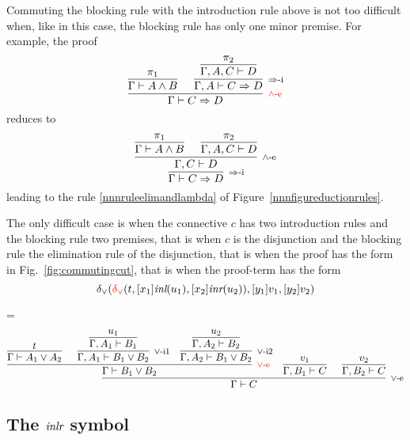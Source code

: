 \documentclass[screen, sigconf,authorversion,nonacm]{acmart}
\theoremstyle{acmdefinition}
\numberwithin{equation}{section}
\newcommand\irule[3]{\infer[\mbox{\footnotesize $#3$}]{#2}{#1}}
\newcommand\abstr[1]{[#1]}
\newcommand\inl{\mbox{\it inl}}
\newcommand\inr{\mbox{\it inr}}
\newcommand\inlr{\mbox{\it inlr}}
\newcommand\elimor{\delta_{\vee}}
\newcommand\elimorint{{\color{red} \delta_{\vee}}}
\begin{document}
Commuting the blocking rule with the introduction rule above is not too
difficult when, like in this case, the blocking rule has only one minor
premise. For example, the proof
$$\irule{\irule{\pi_1}{\Gamma \vdash A \wedge B}{}
         &
         \irule{\irule{\pi_2}
                      {\Gamma, A, C \vdash D}
                      {}
               }
               {\Gamma, A \vdash C \Rightarrow D}
               {\mbox{$\Rightarrow$-i}}
        }
        {\Gamma \vdash C \Rightarrow D}
        {\mbox{\color{red} $\wedge$-e}}$$
reduces to
$$\irule{\irule{\irule{\pi_1}{\Gamma \vdash A \wedge B}{}
                &
                \irule{\pi_2}
                      {\Gamma, A, C \vdash D}
                      {}
               }
               {\Gamma, C \vdash D}
               {\mbox{$\wedge$-e}}
        }
        {\Gamma \vdash C \Rightarrow D}
        {\mbox{$\Rightarrow$-i}}$$
leading to the rule \eqref{nnnruleelimandlambda} of
Figure~\ref{nnnfigureductionrules}.

The only difficult case is when the connective $c$ has two
introduction rules and the blocking rule two premises, that is when
$c$ is the disjunction and the blocking rule the elimination rule of
the disjunction, that is when the proof has the form in
Fig.~\ref{fig:commutingcut}, that is when the proof-term has the form
$$\elimor(\elimorint(t,\abstr{x_1} \inl(u_1), \abstr{x_2} \inr(u_2)),
\abstr{y_1} v_1, \abstr{y_2} v_2)$$

\begin{figure*}[!ht]
  \centering
  \columnwidth=\linewidth
  \[
\irule{\irule{\irule{t}{\Gamma \vdash A_1 \vee A_2}{}
              & \irule{\irule{u_1}{\Gamma, A_1 \vdash B_1}{}}
                      {\Gamma, A_1 \vdash B_1 \vee B_2}
                      {\mbox{$\vee$-i1}}
              & \irule{\irule{u_2}{\Gamma, A_2 \vdash B_2}{}}
                      {\Gamma, A_2 \vdash B_1 \vee B_2}
                      {\mbox{$\vee$-i2}}
               }
               {\Gamma \vdash B_1 \vee B_2}
               {\mbox{\color{red} $\vee$-e}}
               & \irule{v_1}{\Gamma, B_1 \vdash C}{}
               & \irule{v_2}{\Gamma, B_2 \vdash C}{}
        }
        {\Gamma \vdash C}
        {\mbox{$\vee$-e}}
      \]
      \caption{A commuting cut\label{fig:commutingcut}}
\end{figure*}

\subsection{The \texorpdfstring{$\inlr$}{inlr} symbol}
\end{document}
